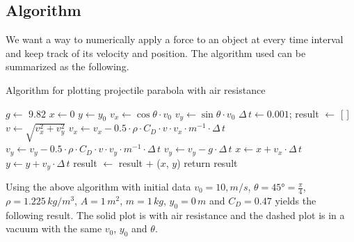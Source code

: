 \documentclass[%
aip,
jmp,
amsmath,amssymb,
reprint,%
]{revtex4-1}
\begin{document}
	\subsection{Algorithm}
	We want a way to numerically apply a force to an object at every time interval and keep track of its velocity and position. The algorithm used can be summarized as the following.
	\begin{algorithm}[H]
		\caption{Algorithm for plotting projectile parabola with air resistance}
		\label{alg:airResistance}
		\begin{algorithmic}
			\State $g \gets $ $9.82$
			\State $x \gets 0$
			\State $y \gets y_0$
			\State $v_x \gets \cos\theta \cdot v_0$
			\State $v_y \gets \sin\theta \cdot v_0$
			\State $\Delta \, t \gets 0.001$;
			\State result $\gets$ [ ]
			\State
			\State $v \gets \sqrt{v_x^2 + v_y^2}$
			\State $v_x \gets v_x - 0.5\cdot\rho\cdot C_D\cdot v\cdot v_x \cdot m^{-1}\cdot\Delta\,t$
			\State $v_y \gets v_y - 0.5\cdot\rho\cdot C_D\cdot v\cdot v_y \cdot m^{-1}\cdot\Delta\,t$
			\State
			\State $v_y \gets v_y -g \cdot \Delta \, t$
			\State
			\State $x \gets x + v_x \cdot \Delta\,t$
			\State $y \gets y + v_y \cdot \Delta\,t$
			\State
			\State result $\gets$ result $+$ ($x$, $y$)
			\EndWhile
			\State
			\State return result
			\EndProcedure
			
		\end{algorithmic}
	\end{algorithm}
	Using the above algorithm with initial data $v_0 =10,m/s$, $\theta = \ang{45} = \frac{\pi}{4}$, $\rho = 1.225\, kg/m^3$, $A = 1\,m^2$, $m = 1\,kg$, $y_0 = 0\,m$ and $C_D = 0.47$ yields the following result. The solid plot is with air resistance and the dashed plot is in a vacuum with the same $v_0$, $y_0$ and $\theta$.
\end{document}
